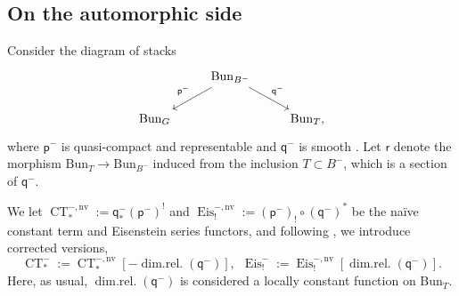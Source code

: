 \documentclass[11pt]{amsart}
\newcommand{\Bun}{{\mathrm{Bun}}}
\newcommand{\Eis}{\operatorname{Eis}}
\newcommand{\CT}{\operatorname{CT}}
\newcommand{\pp}{{\mathsf{p}}}
\newcommand{\qq}{{\mathsf{q}}}
\newcommand{\rr}{{\mathsf{r}}}
\theoremstyle{remark}
\theoremstyle{definition}
\begin{document}
\subsection{On the automorphic side} Consider the diagram of stacks
\[
\begin{tikzcd}
    &\Bun_{B^-}\arrow[swap]{dl}{\pp^-}\arrow{dr}{\qq^-}\\
    \Bun_G&&\Bun_T,
\end{tikzcd}
\]
where $\pp^-$ is quasi-compact and representable and $\qq^-$ is smooth \cite[Remark~0.2.9]{constant-term}. Let $\rr$ denote the morphism $\Bun_T\to\Bun_{B^-}$ induced from the inclusion $T\subset B^-$, which is a section of $\qq^-$.

We let $\CT^{-,\mathrm{nv}}_*:=\qq^-_*(\pp^-)^!$ and $\Eis_!^{-,\mathrm{nv}}:=(\pp^-)_!\circ(\qq^-)^*$ be the na\"ive constant term and Eisenstein series functors, and following \cite[\S8.1.6]{GLC3}, we introduce corrected versions,
\[\CT^-_*:=\CT^{-,\mathrm{nv}}_*[-\operatorname{dim.rel.}(\qq^-)],\ \ \Eis^-_!:=\Eis^{-,\mathrm{nv}}_![\operatorname{dim.rel.}(\qq^-)].\] 
Here, as usual, $\operatorname{dim.rel.}(\qq^-)$ is considered a locally constant function on $\Bun_T$.
\end{document}
